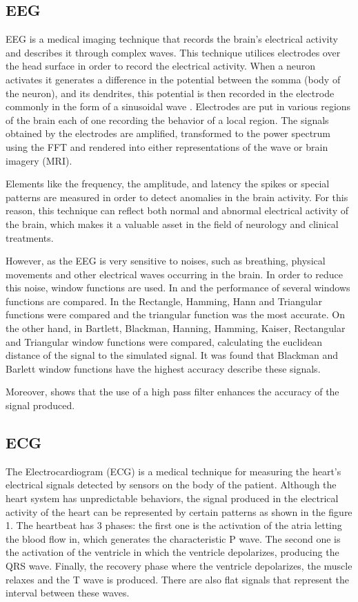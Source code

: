 \subsection{EEG}

EEG is a medical imaging technique that records the brain’s electrical activity and describes it through complex waves.  This technique utilices electrodes over the head surface in order to record the electrical activity. When a neuron activates it generates a difference in the potential between the somma (body of the neuron), and its dendrites, this potential is then recorded in the electrode commonly in the form of a sinusoidal wave \cite{EEGfundamentals}. Electrodes are put in various regions of the brain each of one recording the behavior of a local region. The signals obtained by the electrodes are amplified, transformed to the power spectrum using the FFT and rendered into either representations of the wave or brain imagery (MRI).

Elements like the frequency, the amplitude, and latency the spikes or special patterns  are measured  in order to detect anomalies in the brain activity. For this reason, this technique can reflect both normal and abnormal electrical activity of the brain, which makes it a valuable asset in the field of neurology and clinical treatments. 

However, as the EEG is very sensitive to noises, such as breathing, physical movements and other electrical waves occurring in the brain. In order to reduce this noise, window functions are used. In \cite{EEGwindowfunc1} and \cite{EEGwindowfunc3} the performance of several windows functions are compared. In \cite{EEGwindowfunc1} the Rectangle, Hamming, Hann and Triangular functions were compared and the triangular function was the most accurate. On the other hand, in \cite{EEGwindowfunc2} Bartlett, Blackman, Hanning, Hamming, Kaiser, Rectangular and Triangular window functions were compared, calculating the euclidean distance of the signal to the simulated signal. It was found that Blackman and Barlett window functions have the highest accuracy describe these signals.

Moreover, \cite{EEGwindowfunc1} shows that the use of a high pass filter enhances the accuracy of the signal produced.

\subsection{ECG}
The Electrocardiogram (ECG) is a medical technique for measuring the heart's electrical signals detected by sensors on the body of the patient. Although the heart system has unpredictable behaviors, the signal produced in the electrical activity of the heart can be represented by certain patterns  as shown in the figure 1. The heartbeat has 3 phases: the first one is the activation of the atria letting the blood flow in, which generates the characteristic P wave. The second one is the activation of the ventricle in which the ventricle depolarizes, producing the QRS wave. Finally, the recovery phase where the ventricle depolarizes, the muscle relaxes  and the T wave is produced. There are also flat signals that represent the interval between these waves. 

